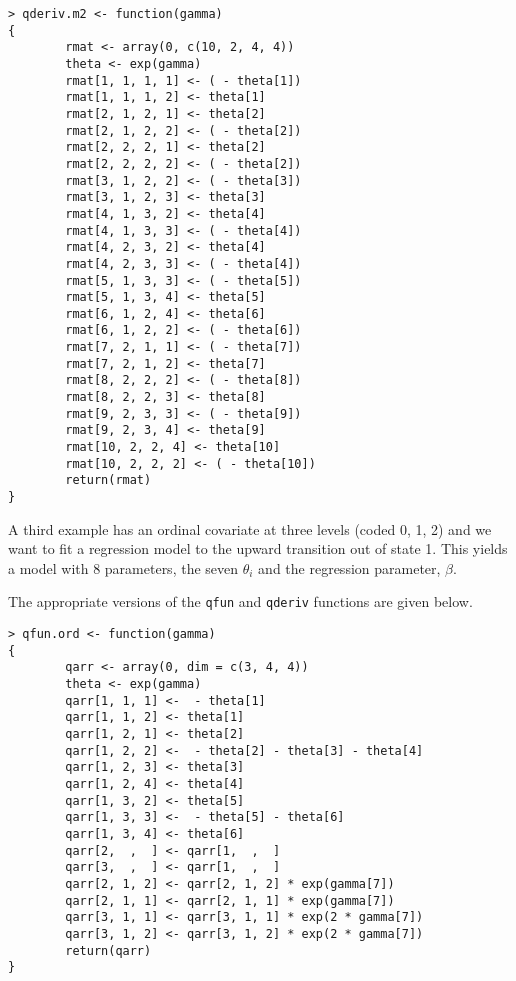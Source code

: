 \documentclass[12pt]{article}
\begin{document}
\begin{verbatim}
> qderiv.m2 <- function(gamma)
{
        rmat <- array(0, c(10, 2, 4, 4))
        theta <- exp(gamma)
        rmat[1, 1, 1, 1] <- ( - theta[1])
        rmat[1, 1, 1, 2] <- theta[1]
        rmat[2, 1, 2, 1] <- theta[2]
        rmat[2, 1, 2, 2] <- ( - theta[2])
        rmat[2, 2, 2, 1] <- theta[2]
        rmat[2, 2, 2, 2] <- ( - theta[2])
        rmat[3, 1, 2, 2] <- ( - theta[3])
        rmat[3, 1, 2, 3] <- theta[3]
        rmat[4, 1, 3, 2] <- theta[4]
        rmat[4, 1, 3, 3] <- ( - theta[4])
        rmat[4, 2, 3, 2] <- theta[4]
        rmat[4, 2, 3, 3] <- ( - theta[4])
        rmat[5, 1, 3, 3] <- ( - theta[5])
        rmat[5, 1, 3, 4] <- theta[5]
        rmat[6, 1, 2, 4] <- theta[6]
        rmat[6, 1, 2, 2] <- ( - theta[6])
        rmat[7, 2, 1, 1] <- ( - theta[7])
        rmat[7, 2, 1, 2] <- theta[7]
        rmat[8, 2, 2, 2] <- ( - theta[8])
        rmat[8, 2, 2, 3] <- theta[8]
        rmat[9, 2, 3, 3] <- ( - theta[9])
        rmat[9, 2, 3, 4] <- theta[9]
        rmat[10, 2, 2, 4] <- theta[10]
        rmat[10, 2, 2, 2] <- ( - theta[10])
        return(rmat)
}
\end{verbatim}

A third example has an ordinal covariate at three levels (coded 0, 1, 2) 
and we want to fit a regression model to the upward transition out of state 1.
This yields a model with 8 parameters, the seven $\theta_i$ and the regression
parameter, $\beta$.

The appropriate versions of the \verb+qfun+ and \verb+qderiv+ functions
are given below.

\begin{verbatim}
> qfun.ord <- function(gamma)
{
        qarr <- array(0, dim = c(3, 4, 4))
        theta <- exp(gamma)
        qarr[1, 1, 1] <-  - theta[1]
        qarr[1, 1, 2] <- theta[1]
        qarr[1, 2, 1] <- theta[2]
        qarr[1, 2, 2] <-  - theta[2] - theta[3] - theta[4]
        qarr[1, 2, 3] <- theta[3]
        qarr[1, 2, 4] <- theta[4]
        qarr[1, 3, 2] <- theta[5]
        qarr[1, 3, 3] <-  - theta[5] - theta[6]
        qarr[1, 3, 4] <- theta[6]
        qarr[2,  ,  ] <- qarr[1,  ,  ]
        qarr[3,  ,  ] <- qarr[1,  ,  ]
        qarr[2, 1, 2] <- qarr[2, 1, 2] * exp(gamma[7])
        qarr[2, 1, 1] <- qarr[2, 1, 1] * exp(gamma[7])
        qarr[3, 1, 1] <- qarr[3, 1, 1] * exp(2 * gamma[7])
        qarr[3, 1, 2] <- qarr[3, 1, 2] * exp(2 * gamma[7])
        return(qarr)
}
\end{verbatim}
\end{document}
